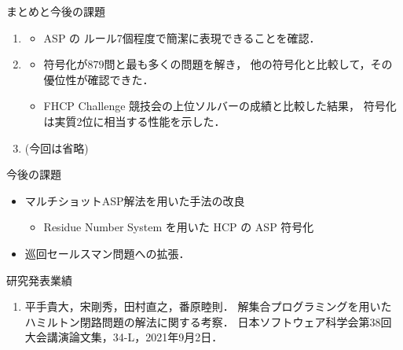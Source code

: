 \documentclass[dvipdfmx]{beamer}
\begin{document}
\begin{frame}{まとめと今後の課題}

\begin{enumerate}
\item {}
  \begin{itemize}
  \item ASP の \alert{ルール7個}程度で簡潔に表現できることを確認．
  \end{itemize}
\item {}
  \begin{itemize}
  \item {} 符号化が879問と最も多くの問題を解き，
    他の符号化と比較して，その優位性が確認できた．
  \item FHCP Challenge 競技会の上位ソルバーの成績と比較した結果，
     符号化は\alert{実質2位}に相当する性能を示した．
  \end{itemize}
\item {} (今回は省略)
\end{enumerate}

\begin{block}{今後の課題}
  \begin{itemize}
  \item マルチショットASP解法を用いた手法の改良
    \begin{itemize}
    \item Residue Number System を用いた
      HCP の ASP 符号化
    \end{itemize}
  \item 巡回セールスマン問題への拡張．
  \end{itemize}
\end{block}
\end{frame}

\begin{frame}{研究発表業績}
  \begin{enumerate}
  \item 平手貴大，宋剛秀，田村直之，番原睦則．
    解集合プログラミングを用いたハミルトン閉路問題の解法に関する考察．
    日本ソフトウェア科学会第38回大会講演論文集，34-L，2021年9月2日．
  \end{enumerate}
\end{frame}
\end{document}
